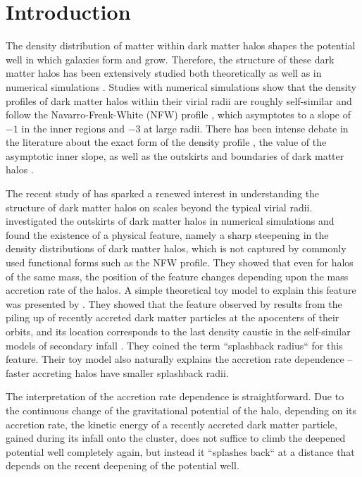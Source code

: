 \documentclass[iop, apjl, twocolappendix, numberedappendix]{emulateapj}
\begin{document}
\section{Introduction}
\label{sec:Introduction}

The density distribution of matter within dark matter halos shapes
the potential well in which galaxies form and grow. Therefore, the
structure of these dark matter halos has been extensively studied
both theoretically as well as in numerical simulations \citep[see
e.g.,][]{gunn1972infall, fillmore1984self, bertschinger1985self,
navarro1997universal, moore1999dark}. Studies with numerical
simulations show that the density profiles of dark matter halos
within their virial radii are roughly self-similar and follow the
Navarro-Frenk-White (NFW) profile \citep{navarro1997universal},
which asymptotes to a slope of $-1$ in the inner regions and $-3$ at
large radii. There has been intense debate in the literature about
the exact form of the density profile 
\citep[e.g.,][]{navarro2004inner}, the value of the asymptotic inner slope,
as well as the outskirts and boundaries of dark matter halos
\citep{cuesta2008virialized, more2011overdensity, diemer2013pseudo}. 

The recent study of \citet{diemer2014dependence} has sparked a
renewed interest in understanding the structure of dark matter halos
on scales beyond the typical virial radii.
\citet{diemer2014dependence} investigated the outskirts of dark
matter halos in numerical simulations and found the existence of a
physical feature, namely a sharp steepening in the density
distributions of dark matter halos, which is not captured by
commonly used functional forms such as the NFW profile. They showed
that even for halos of the same mass, the position of the feature
changes depending upon the mass accretion rate of the halos. A simple
theoretical toy model to explain this feature was presented by
\citet{adhikari2014splashback}. They showed that the feature
observed by \citet{diemer2014dependence} results from the  piling up
of recently accreted dark matter particles at the apocenters of
their orbits, and its location corresponds to the last density
caustic in the self-similar models of secondary infall
\citep{fillmore1984self, bertschinger1985self, lithwick2011self}.
They coined the term ``splashback radius`` for this feature. Their
toy model also naturally explains the accretion rate dependence --
faster accreting halos have smaller splashback radii. 

The interpretation of the accretion rate dependence is
straightforward. Due to the continuous change of the gravitational
potential of the halo, depending on its accretion rate, the kinetic
energy of a recently accreted dark matter particle, gained during
its infall onto the cluster, does not suffice to climb the deepened
potential well completely again, but instead it ``splashes back`` at
a distance that depends on the recent deepening of the potential
well.
\end{document}
